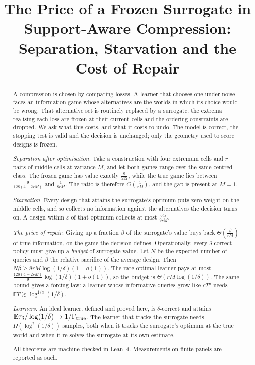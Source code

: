 



\title{The Price of a Frozen Surrogate in Support-Aware Compression:\\
Separation, Starvation and the Cost of Repair}

\author{
}

\maketitle

\begin{abstract}
A compression is chosen by comparing losses. A learner that chooses one under noise faces an
information game whose alternatives are the worlds in which its choice would be wrong. That
alternative set is routinely replaced by a surrogate: the extrema realising each loss are
frozen at their current cells and the ordering constraints are dropped. We ask what this
costs, and what it costs to undo. The model is correct, the stopping test is valid and the
decision is unchanged; only the geometry used to score designs is frozen.

\emph{Separation after optimisation.} Take a construction with four extremum cells and $r$
pairs of middle cells at variance $M$, and let both games range over the same centred class.
The frozen game has value exactly $\frac{9}{512}$, while the true game lies between
$\frac{9}{128(4+2rM)}$ and $\frac{1}{8rM}$. The ratio is therefore $\Theta(\frac{1}{rM})$, and
the gap is present at $M=1$.

\emph{Starvation.} Every design that attains the surrogate's optimum puts zero weight on the
middle cells, and so collects no information against the alternatives the decision turns on.
A design within $\varepsilon$ of that optimum collects at most $\frac{64\varepsilon}{9rM}$.

\emph{The price of repair.} Giving up a fraction $\beta$ of the surrogate's value buys back
$\Theta(\frac{\beta}{rM})$ of true information, on the game the decision defines. Operationally,
every $\delta$-correct policy must give up a \emph{budget} of surrogate value. Let $N$ be the
expected number of queries and $\beta$ the relative sacrifice of the average design. Then
$N\beta\ge8rM\log(1/\delta)(1-o(1))$. The rate-optimal learner pays at most
$\frac{128(4+2rM)}{9}\log(1/\delta)(1+o(1))$, so the budget is $\Theta(rM\log(1/\delta))$. The
same bound gives a forcing law: a learner whose informative queries grow like $cT^{a}$ needs
$\mathbb{E}T\gtrsim\log^{1/a}(1/\delta)$.

\emph{Learners.} An ideal learner, defined and proved here, is $\delta$-correct and attains
$\mathbb{E}\tau_{\delta}/\log(1/\delta)\to1/\Gamma_{\rm true}$. The learner that tracks the
surrogate needs $\Omega(\log^{2}(1/\delta))$ samples, both when it tracks the surrogate's optimum
at the true world and when it re-solves the surrogate at its own estimate.

All theorems are machine-checked in Lean~4. Measurements on finite panels are reported as such.
\end{abstract}

